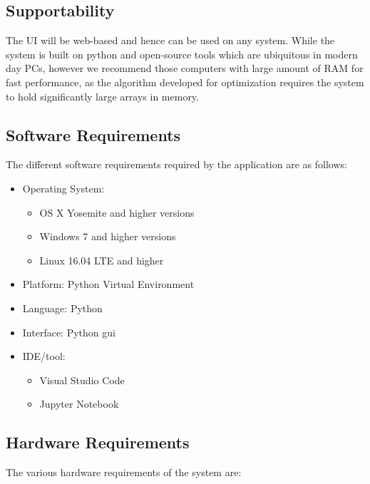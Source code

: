     \subsection{Supportability}
    The UI will be web-based and hence can be used on any system. While the system is built on python and open-source tools which are ubiquitous in modern day PCs, however we recommend those computers with large amount of RAM for fast performance, as the algorithm developed for optimization requires the system to hold significantly large arrays in memory.

    \subsection{Software Requirements}
    The different software requirements required by the application are as follows:
    \begin{itemize}
        \item Operating System:
        \begin{itemize}
            \item OS X Yosemite and higher versions
            \item Windows 7 and higher versions
            \item Linux 16.04 LTE and higher
        \end{itemize}
        \item Platform: Python Virtual Environment
        \item Language: Python
        \item Interface: Python \gls{gui}
        \item IDE/tool:
        \begin{itemize}
            \item Visual Studio Code
            \item Jupyter Notebook
        \end{itemize}
    \end{itemize}

    \subsection{Hardware Requirements}
    The various hardware requirements of the system are:

